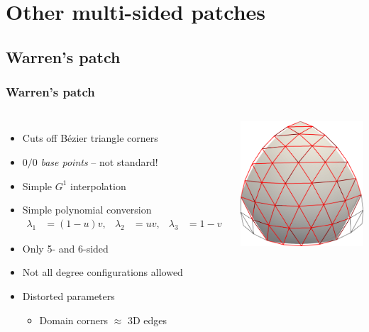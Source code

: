 \documentclass[xcolor=table]{beamer}
\begin{document}
\section{Other multi-sided patches}
\subsection{Warren's patch}

\begin{frame}
  \frametitle{Warren's patch}
  \begin{columns}
    \begin{itemize}
    \item Cuts off B\'ezier triangle corners
    \item $0/0$ \emph{base points} -- not standard!
    \item Simple $G^1$ interpolation
    \item Simple polynomial conversion
      \begin{align*}
        \lambda_1&=(1-u)v, & \lambda_2&=uv, & \lambda_3&=1-v
      \end{align*}
    \item Only 5- and 6-sided
    \item Not all degree configurations allowed
    \item Distorted parameters
      \begin{itemize}
        \item Domain corners $\approx$ 3D edges
      \end{itemize}
    \end{itemize}
    \centering
    \includegraphics[height=.35\textheight]{images/warren-cnet.png}\\

\end{columns}
\end{frame}
\end{document}
